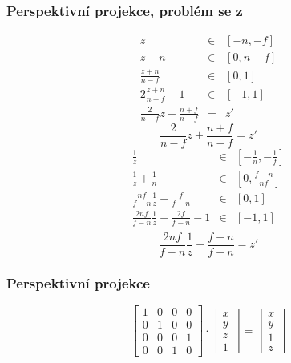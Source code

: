\begin{frame}
\frametitle{Perspektivní projekce, problém se z}
\begin{multicols}{2}
{\tiny
\begin{eqnarray*}
	z &\in& [-n,-f] \\
	z+n &\in& [0,n-f] \\
	\frac{z+n}{n-f} &\in& [0,1] \\
	2\frac{z+n}{n-f}-1 &\in& [-1,1] \\
	\frac{2}{n-f}z+\frac{n+f}{n-f} &=& z'
\end{eqnarray*}
\begin{equation}
\label{eq:linz}
\frac{2}{n-f}z+\frac{n+f}{n-f} = z'
\end{equation}
}
\vfill
{\tiny
\begin{eqnarray*}
	\frac{1}{z} &\in& [-\frac{1}{n},-\frac{1}{f}] \\
	\frac{1}{z}+\frac{1}{n} &\in& [0,\frac{f-n}{nf}] \\
	\frac{nf}{f-n}\frac{1}{z}+\frac{f}{f-n} &\in& [0,1] \\
	\frac{2nf}{f-n}\frac{1}{z}+\frac{2f}{f-n}-1 &\in& [-1,1] \\
\end{eqnarray*}
\begin{equation}
\label{eq:persz}
\frac{2nf}{f-n}\frac{1}{z}+\frac{f+n}{f-n} = z'
\end{equation}
}
\end{multicols}

\end{frame}

\begin{frame}
\frametitle{Perspektivní projekce}
{\tiny
\begin{equation}
\label{eq:swap}
\left[
\begin{array}{cccc} 
1 & 0 & 0 & 0 \\
0 & 1 & 0 & 0 \\
0 & 0 & 0 & 1 \\
0 & 0 & 1 & 0
\end{array}
\right]
\cdot
\left[
\begin{array}{c}
x \\
y \\
z \\
1
\end{array}
\right]
=
\left[
\begin{array}{c} 
x \\
y \\
1 \\
z
\end{array}
\right]
\end{equation}
}
\end{frame}

